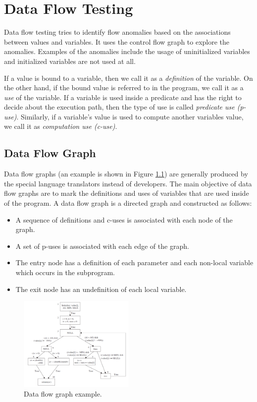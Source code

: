\chapter{Data Flow Testing}
Data flow testing tries to identify flow anomalies based on the associations between values and variables. It uses the control flow graph to explore the anomalies. Examples of the anomalies include the usage of uninitialized variables and initialized variables are not used at all.

If a value is bound to a variable, then we call it as a \emph{definition} of the variable. On the other hand, if the bound value is referred to in the program, we call it as a \emph{use} of the variable. If a variable is used inside a predicate and has the right to decide about the execution path, then the type of use is called \emph{predicate use (p-use)}. Similarly, if a variable's value is used to compute another variables value, we call it as \emph{computation use (c-use)}.

\section{Data Flow Graph}
Data flow graphs (an example is shown in Figure \ref{fig:data-flow-graph}) are generally produced by the special language translators instead of developers. The main objective of data flow graphs are to mark the definitions and uses of variables that are used inside of the program. A data flow graph is a directed graph and constructed as follows:
\begin{itemize}
    \item A sequence of definitions and c-uses is associated with each node of the graph.
    \item A set of p-uses is associated with each edge of the graph.
    \item The entry node has a definition of each parameter and each non-local variable which occurs in the subprogram.
    \item The exit node has an undefinition of each local variable.
\end{itemize}

\begin{figure}[H]
    \centering
    \includegraphics[width=0.5\textwidth]{images/data-flow-graph.png}
    \caption{Data flow graph example.}
    \label{fig:data-flow-graph}
\end{figure}

